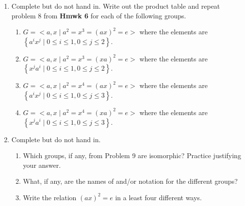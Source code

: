 \begin{enumerate}
  \newpage

  \item Complete but do not hand in. Write out the product table and repeat problem 8 from \textbf{Hmwk 6} for each of the following groups.
  \begin{enumerate}
    \item $G=<a, x \mid a^{2}=x^{3}=(a x)^{2}=e>$ where the elements are $\left\{a^{i} x^{j} \mid 0 \leq i \leq 1,0 \leq j \leq 2\right\}$.
    \begin{subanswer}
      
    \end{subanswer}
    \item $G=<a, x \mid a^{2}=x^{3}=(x a)^{2}=e>$ where the elements are $\left\{x^{j} a^{i} \mid 0 \leq i \leq 1,0 \leq j \leq 2\right\}$.
    \begin{subanswer}
      
    \end{subanswer}
    \item $G=<a, x \mid a^{2}=x^{4}=(a x)^{2}=e>$ where the elements are $\left\{a^{i} x^{j} \mid 0 \leq i \leq 1,0 \leq j \leq 3\right\}$.
    \begin{subanswer}
      
    \end{subanswer}
    \item $G=<a, x \mid a^{2}=x^{4}=(x a)^{2}=e>$ where the elements are $\left\{x^{j} a^{i} \mid 0 \leq i \leq 1,0 \leq j \leq 3\right\}$.
    \begin{subanswer}
      
    \end{subanswer}
  \end{enumerate}
  \item Complete but do not hand in.
  \begin{enumerate}
    \item Which groups, if any, from Problem 9 are isomorphic? Practice justifying your answer.
    \begin{subanswer}
      
    \end{subanswer}
    \item What, if any, are the names of and/or notation for the different groups?
    \begin{subanswer}
      
    \end{subanswer}
    \item Write the relation $(a x)^{2}=e$ in a least four different ways.
    \begin{subanswer}
      
    \end{subanswer}
  \end{enumerate}
\end{enumerate}